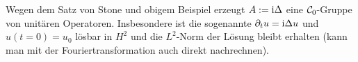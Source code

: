 \linie

\begin{Bsp}
    Wegen dem Satz von Stone und obigem Beispiel erzeugt $A := \mathrm{i}\Delta$ eine $\mathcal{C}_0$-Gruppe
    von unitären Operatoren.
    Insbesondere ist die sogenannte 
    $\partial_t u = \mathrm{i}\Delta u$ und $u(t = 0) = u_0$ lösbar in $H^2$
    und die $L^2$-Norm der Lösung bleibt erhalten
    (kann man mit der Fouriertransformation auch direkt nachrechnen).
\end{Bsp}

\pagebreak
